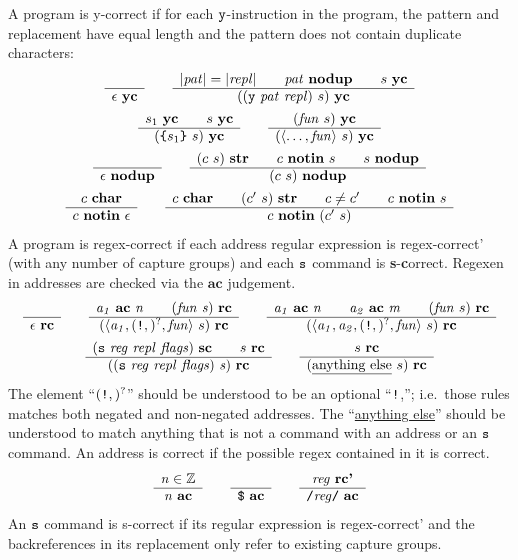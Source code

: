 \documentclass[11pt]{article}
\newcommand\RULE[3][]{\begin{array}{c} #2 \\ \hline #3 \end{array}}
\newcommand\J[1]{\ensuremath{\textbf{#1}}}
\newcommand\cmd[1]{\ensuremath{\text{\texttt{#1}}}}
\renewcommand\arg[1]{\ensuremath{\mathit{#1}}}
\newcommand\angles[1]{\langle #1 \rangle}
\begin{document}
A program is y-correct if for each \cmd{y}-instruction in the program, the pattern and replacement have equal length and the pattern does not contain duplicate characters:
\begin{gather*}
	\RULE{}{\epsilon\ \J{yc}} \qquad
	\RULE{|\arg{pat}| = |\arg{repl}| \qquad \arg{pat}\ \J{nodup} \qquad s\ \J{yc}}{((\cmd{y}\ \arg{pat}\ \arg{repl})\ s)\ \J{yc}} \\
%
	\RULE{s_1\ \J{yc} \qquad s\ \J{yc}}{(\cmd{\{} s_1 \cmd{\}}\ s)\ \J{yc}} \qquad
	\RULE{(\arg{fun}\ s)\ \J{yc}}{(\angles{\ldots, \arg{fun}}\ s)\ \J{yc}} \\
	\RULE{}{\epsilon\ \J{nodup}} \qquad
	\RULE{(c\ s)\ \J{str} \qquad c\ \J{notin}\ s \qquad s\ \J{nodup}}{(c\ s)\ \J{nodup}} \\
	\RULE{c\ \J{char}}{c\ \J{notin}\ \epsilon} \qquad
	\RULE{c\ \J{char} \qquad (c'\ s)\ \J{str} \qquad c \not= c' \qquad c\ \J{notin}\ s}{c\ \J{notin}\ (c'\ s)}
\end{gather*}
%
A program is regex-correct if each address regular expression is regex-correct' (with any number of capture groups) and each \cmd{s} command is \textbf{s}-\textbf{c}orrect.
Regexen in addresses are checked via the \J{ac} judgement.
\begin{gather*}
	\RULE{}{\epsilon\ \J{rc}} \qquad
	\RULE{\arg{a_1}\ \J{ac}\ \arg{n} \qquad (\arg{fun}\ \arg{s})\ \J{rc}}{(\angles{\arg{a_1}, (\cmd{!},)^?, \arg{fun}}\ s)\ \J{rc}} \qquad
	\RULE{\arg{a_1}\ \J{ac}\ \arg{n} \qquad \arg{a_2}\ \J{ac}\ \arg{m} \qquad (\arg{fun}\ s)\ \J{rc}}{(\angles{\arg{a_1}, \arg{a_2}, (\cmd{!},)^?, \arg{fun}}\ s)\ \J{rc}} \\
	\RULE{(\cmd{s}\ \arg{reg}\ \arg{repl}\ \arg{flags})\ \J{sc} \qquad s\ \J{rc}}{((\cmd{s}\ \arg{reg}\ \arg{repl}\ \arg{flags})\ \arg{s})\ \J{rc}} \qquad
	\RULE{s\ \J{rc}}{(\text{\underline{anything else}}\ s)\ \J{rc}}
\end{gather*}
The element ``$(\cmd{!},)^?$'' should be understood to be an optional ``\cmd{!},''; i.e.\ those rules matches both negated and non-negated addresses.
The ``\underline{anything else}'' should be understood to match anything that is not a command with an address or an \cmd{s} command.
%
An address is correct if the possible regex contained in it is correct.
\begin{gather*}
	\RULE{\arg{n} \in \mathbb{Z}}{\arg{n}\ \J{ac}} \qquad
	\RULE{}{\cmd{\$}\ \J{ac}} \qquad
	\RULE{\arg{reg}\ \J{rc'}}{\cmd{/}\arg{reg}\cmd{/}\ \J{ac}}
\end{gather*}
%
An \cmd{s} command is s-correct if its regular expression is regex-correct' and the backreferences in its replacement only refer to existing capture groups.
\end{document}
